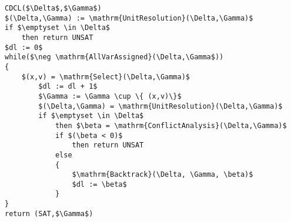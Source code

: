 \begin{lstlisting}[caption = Example CDCL Algorithm, mathescape]
CDCL($\Delta$,$\Gamma$)
$(\Delta,\Gamma) := \mathrm{UnitResolution}(\Delta,\Gamma)$
if $\emptyset \in \Delta$
    then return UNSAT
$dl := 0$
while($\neg \mathrm{AllVarAssigned}(\Delta,\Gamma$))
{
    $(x,v) = \mathrm{Select}(\Delta,\Gamma)$
        $dl := dl + 1$
        $\Gamma := \Gamma \cup \{ (x,v)\}$
        $(\Delta,\Gamma) = \mathrm{UnitResolution}(\Delta,\Gamma)$
        if $\emptyset \in \Delta$
            then $\beta = \mathrm{ConflictAnalysis}(\Delta,\Gamma)$
            if $(\beta < 0)$
                then return UNSAT
            else
            { 
                $\mathrm{Backtrack}(\Delta, \Gamma, \beta)$
                $dl := \beta$
            }
}
return (SAT,$\Gamma$)
\end{lstlisting}


\begin{comment}

Resolution Proof System


\begin{mydef}[Resolution Proof System] The derivable resolution sequents $\Gamma \modres{n} C$ with a derivation of size $n$ are conveniently defined by two rules: Subsumption (or axiom) and resolution.
%
\bigskip

\label{def:resolutionps}
\begin{center}
\AxiomC{\phantom{$\Delta \modres{n} C \vee l$}}
\RightLabel{($\Sub$)  $C \subseteq C'$ }
\UnaryInfC{$\Delta,C \modres{0} C'$}
\DisplayProof
%
\qquad
%
\AxiomC{$\Delta \modres{n} C \vee l$}
\AxiomC{$ \Delta \modres{m} C' \vee \bar{l}$}
\RightLabel{($\Res$)}
\BinaryInfC{$\Delta \modres{n + m + 1} C \vee C'$}
\DisplayProof 
\end{center}
\bigskip
\end{mydef}

\end{comment}

\begin{comment}
\section{Translation to CNF}
In order to apply most modern SAT solvers typically one has to first encode the SAT problem as a CNF formula. There are a number of translations available, some naive approaches can exponentially increase the size of the resulting formula. In the following we look at the most commonly used encoding called the Tseitin Expansion \cite{GT83}.


\section{The Future: Satisfiability Modulo Theory}
More recently a new type of solver has emerged that can deal with first order formulae, these solvers are based on SAT algorithms and include extra theory modules for reasoning about arithmetic,arrays, quantifiers and equality, hence the name \emph{satisfiability modulo theory}.
\end{comment}
